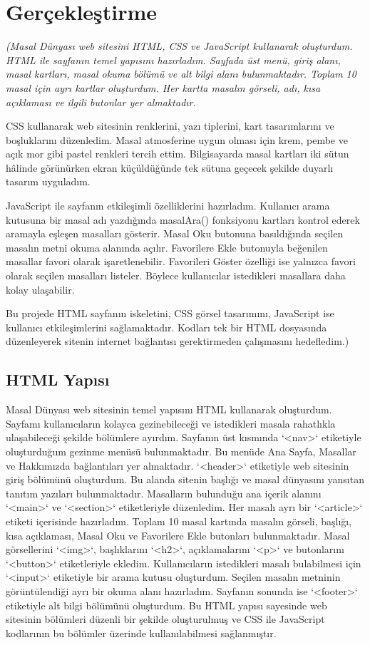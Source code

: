 \documentclass[12pt,a4paper]{article}
\newcommand{\aciklama}[1]{{\color{gray}\itshape (#1)}}
\begin{document}
\section{Gerçekleştirme}
\aciklama{Masal Dünyası web sitesini HTML, CSS ve JavaScript kullanarak oluşturdum. HTML ile sayfanın temel yapısını hazırladım. Sayfada üst menü, giriş alanı, masal kartları, masal okuma bölümü ve alt bilgi alanı bulunmaktadır. Toplam 10 masal için ayrı kartlar oluşturdum. Her kartta masalın görseli, adı, kısa açıklaması ve ilgili butonlar yer almaktadır.

CSS kullanarak web sitesinin renklerini, yazı tiplerini, kart tasarımlarını ve boşluklarını düzenledim. Masal atmosferine uygun olması için krem, pembe ve açık mor gibi pastel renkleri tercih ettim. Bilgisayarda masal kartları iki sütun hâlinde görünürken ekran küçüldüğünde tek sütuna geçecek şekilde duyarlı tasarım uyguladım.

JavaScript ile sayfanın etkileşimli özelliklerini hazırladım. Kullanıcı arama kutusuna bir masal adı yazdığında masalAra() fonksiyonu kartları kontrol ederek aramayla eşleşen masalları gösterir. Masal Oku butonuna basıldığında seçilen masalın metni okuma alanında açılır. Favorilere Ekle butonuyla beğenilen masallar favori olarak işaretlenebilir. Favorileri Göster özelliği ise yalnızca favori olarak seçilen masalları listeler. Böylece kullanıcılar istedikleri masallara daha kolay ulaşabilir.

Bu projede HTML sayfanın iskeletini, CSS görsel tasarımını, JavaScript ise kullanıcı etkileşimlerini sağlamaktadır. Kodları tek bir HTML dosyasında düzenleyerek sitenin internet bağlantısı gerektirmeden çalışmasını hedefledim.}

\subsection{HTML Yapısı}
Masal Dünyası web sitesinin temel yapısını HTML kullanarak oluşturdum. Sayfamı kullanıcıların kolayca gezinebileceği ve istedikleri masala rahatlıkla ulaşabileceği şekilde bölümlere ayırdım. Sayfanın üst kısmında `<nav>` etiketiyle oluşturduğum gezinme menüsü bulunmaktadır. Bu menüde Ana Sayfa, Masallar ve Hakkımızda bağlantıları yer almaktadır. `<header>` etiketiyle web sitesinin giriş bölümünü oluşturdum. Bu alanda sitenin başlığı ve masal dünyasını yansıtan tanıtım yazıları bulunmaktadır. Masalların bulunduğu ana içerik alanını `<main>` ve `<section>` etiketleriyle düzenledim. Her masalı ayrı bir `<article>` etiketi içerisinde hazırladım. Toplam 10 masal kartında masalın görseli, başlığı, kısa açıklaması, Masal Oku ve Favorilere Ekle butonları bulunmaktadır. Masal görsellerini `<img>`, başlıklarını `<h2>`, açıklamalarını `<p>` ve butonlarını `<button>` etiketleriyle ekledim. Kullanıcıların istedikleri masalı bulabilmesi için `<input>` etiketiyle bir arama kutusu oluşturdum. Seçilen masalın metninin görüntülendiği ayrı bir okuma alanı hazırladım. Sayfanın sonunda ise `<footer>` etiketiyle alt bilgi bölümünü oluşturdum. Bu HTML yapısı sayesinde web sitesinin bölümleri düzenli bir şekilde oluşturulmuş ve CSS ile JavaScript kodlarının bu bölümler üzerinde kullanılabilmesi sağlanmıştır.
\end{document}
